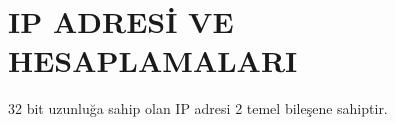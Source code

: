 \section{IP ADRESİ VE HESAPLAMALARI}
32 bit uzunluğa sahip olan IP adresi 2 temel bileşene sahiptir. 